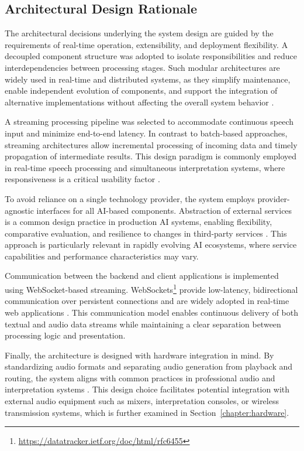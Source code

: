\subsection{Architectural Design Rationale}
\label{sec:design_rationale}
The architectural decisions underlying the system design are guided by the requirements of real-time operation, extensibility, and deployment flexibility. A decoupled component structure was adopted to isolate responsibilities and reduce interdependencies between processing stages. Such modular architectures are widely used in real-time and distributed systems, as they simplify maintenance, enable independent evolution of components, and support the integration of alternative implementations without affecting the overall system behavior \cite{dragoni2017microservices, Aminzadeh2009Advocate, Sethiya2023EndtoEndSurvey}.

A streaming processing pipeline was selected to accommodate continuous speech input and minimize end-to-end latency. In contrast to batch-based approaches, streaming architectures allow incremental processing of incoming data and timely propagation of intermediate results. This design paradigm is commonly employed in real-time speech processing and simultaneous interpretation systems, where responsiveness is a critical usability factor \cite{fugen2007simultaneous, grissom2014realtime}.

To avoid reliance on a single technology provider, the system employs provider-agnostic interfaces for all AI-based components. Abstraction of external services is a common design practice in production AI systems, enabling flexibility, comparative evaluation, and resilience to changes in third-party services \cite{armbrust2020cloud}. This approach is particularly relevant in rapidly evolving AI ecosystems, where service capabilities and performance characteristics may vary.

Communication between the backend and client applications is implemented using WebSocket-based streaming. WebSockets\footnote{\url{https://datatracker.ietf.org/doc/html/rfc6455}} provide low-latency, bidirectional communication over persistent connections and are widely adopted in real-time web applications \cite{sathya2025realtime}. This communication model enables continuous delivery of both textual and audio data streams while maintaining a clear separation between processing logic and presentation.

Finally, the architecture is designed with hardware integration in mind. By standardizing audio formats and separating audio generation from playback and routing, the system aligns with common practices in professional audio and interpretation systems \cite{conference_interpreting_new_tech, wang2017realtimeaudio}. This design choice facilitates potential integration with external audio equipment such as mixers, interpretation consoles, or wireless transmission systems, which is further examined in Section~\ref{chapter:hardware}.


